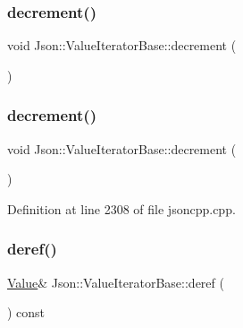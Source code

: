 \subsubsection{\texorpdfstring{decrement()}{decrement()}\hspace{0.1cm}{\footnotesize\ttfamily [1/2]}}
{\footnotesize\ttfamily void Json\+::\+Value\+Iterator\+Base\+::decrement (\begin{DoxyParamCaption}{ }\end{DoxyParamCaption})\hspace{0.3cm}{\ttfamily [protected]}}

\hypertarget{class_json_1_1_value_iterator_base_affc8cf5ff54a9f432cc693362c153fa6}{}\label{class_json_1_1_value_iterator_base_affc8cf5ff54a9f432cc693362c153fa6} 
\subsubsection{\texorpdfstring{decrement()}{decrement()}\hspace{0.1cm}{\footnotesize\ttfamily [2/2]}}
{\footnotesize\ttfamily void Json\+::\+Value\+Iterator\+Base\+::decrement (\begin{DoxyParamCaption}{ }\end{DoxyParamCaption})\hspace{0.3cm}{\ttfamily [protected]}}



Definition at line 2308 of file jsoncpp.\+cpp.

\hypertarget{class_json_1_1_value_iterator_base_a4521c4a1e7cba96a4964f3a540c68676}{}\label{class_json_1_1_value_iterator_base_a4521c4a1e7cba96a4964f3a540c68676} 
\subsubsection{\texorpdfstring{deref()}{deref()}\hspace{0.1cm}{\footnotesize\ttfamily [1/2]}}
{\footnotesize\ttfamily \hyperlink{class_json_1_1_value}{Value}\& Json\+::\+Value\+Iterator\+Base\+::deref (\begin{DoxyParamCaption}{ }\end{DoxyParamCaption}) const\hspace{0.3cm}{\ttfamily [protected]}}


